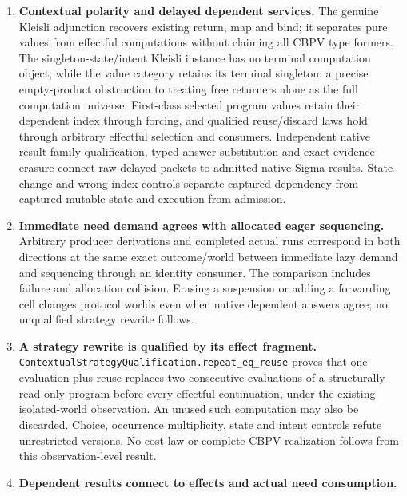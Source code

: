 \documentclass[11pt]{article}
\theoremstyle{definition}
\theoremstyle{remark}
\begin{document}
\begin{enumerate}
  A product of actual native conversion reply algebras connects application
  to the checker and formed proof use. Provider selection once versus per
  call preserves acceptance support but changes accepted artifact pairs,
  multiplicity and intents. These results qualify a semantic candidate,
  not a reified dependent calculus or a runtime migration.
\item \textbf{Contextual polarity and delayed dependent services.}
  The genuine Kleisli adjunction recovers existing return, map and bind;
  it separates pure values from effectful computations without claiming
  all CBPV type formers. The singleton-state/intent Kleisli instance has no
  terminal computation object, while the value category retains its terminal
  singleton: a precise empty-product obstruction to treating free returners
  alone as the full computation universe. First-class selected program values retain their
  dependent index through forcing, and qualified reuse/discard laws hold
  through arbitrary effectful selection and consumers. Independent native
  result-family qualification, typed answer substitution and exact evidence
  erasure connect raw delayed packets to admitted native Sigma results.
  State-change and wrong-index controls separate captured dependency from
  captured mutable state and execution from admission.
\item \textbf{Immediate need demand agrees with allocated eager sequencing.}
  Arbitrary producer derivations and completed actual runs correspond in
  both directions at the same exact outcome/world between immediate lazy
  demand and sequencing through an identity consumer. The comparison
  includes failure and allocation collision. Erasing a suspension or adding
  a forwarding cell changes protocol worlds even when native dependent
  answers agree; no unqualified strategy rewrite follows.
\item \textbf{A strategy rewrite is qualified by its effect fragment.}
  \nolinkurl{ContextualStrategyQualification.repeat_eq_reuse} proves that
  one evaluation plus reuse replaces two consecutive evaluations of a
  structurally read-only program before every effectful continuation, under
  the existing isolated-world observation. An unused such computation may
  also be discarded. Choice, occurrence multiplicity, state and intent
  controls refute unrestricted versions. No cost law or complete CBPV
  realization follows from this observation-level result.
\item \textbf{Dependent results connect to effects and actual need consumption.}

\end{enumerate}
\end{document}
